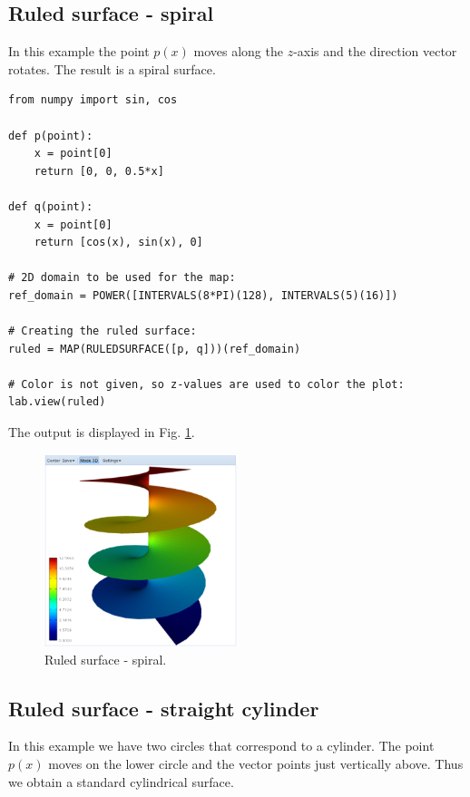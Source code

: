 \documentclass[article,A4,12pt]{llncs}
\begin{document}
\subsection{Ruled surface - spiral}

In this example the point $p(x)$ moves along the $z$-axis and 
the direction vector rotates. The result is a spiral surface.

\begin{verbatim}
from numpy import sin, cos

def p(point):
    x = point[0]
    return [0, 0, 0.5*x]
  
def q(point):
    x = point[0]
    return [cos(x), sin(x), 0]

# 2D domain to be used for the map:  
ref_domain = POWER([INTERVALS(8*PI)(128), INTERVALS(5)(16)])

# Creating the ruled surface:
ruled = MAP(RULEDSURFACE([p, q]))(ref_domain)

# Color is not given, so z-values are used to color the plot:
lab.view(ruled)
\end{verbatim}
The output is displayed in Fig. \ref{fig:curves-7}.

\begin{figure}[!ht]
\begin{center}
\includegraphics[width=0.5\textwidth]{img/curves-7.png}
\end{center}
\vspace{-2mm}
\caption{Ruled surface - spiral.}
\label{fig:curves-7}
\end{figure}

\subsection{Ruled surface - straight cylinder}

In this example we have two circles that correspond to a cylinder.
The point $p(x)$ moves on the lower circle and the vector points 
just vertically above. Thus we obtain a standard cylindrical surface. 
\end{document}
